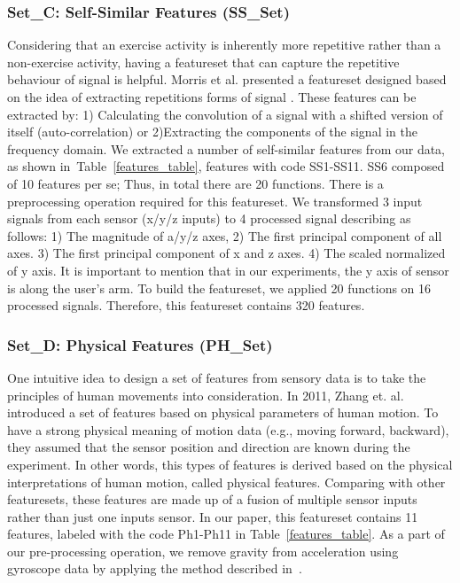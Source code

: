 \documentclass[journal,article,submit,moreauthors,pdftex]{Definitions/mdpi}
\begin{document}
\subsubsection{Set\_C: Self-Similar Features (SS\_Set)}

Considering that an exercise activity is inherently more repetitive rather than a non-exercise activity, having a featureset that can capture the repetitive behaviour of signal is helpful. Morris et al. presented a featureset designed based on the idea of extracting repetitions forms of signal \cite{morris2014recofit}. These features can be extracted by: 1) Calculating the convolution of a signal with a shifted version of itself (auto-correlation) or 2)Extracting the components of the signal in the frequency domain. We extracted a number of self-similar features from our data, as shown in~Table~\ref{features_table}, features with code SS1-SS11. SS6 composed of 10 features per se; Thus, in total there are 20 functions.
There is a preprocessing operation required for this featureset. We transformed 3 input signals from each sensor (x/y/z inputs) to 4 processed signal describing as follows: 1) The magnitude of a/y/z axes, 2) The first principal component of all axes. 3) The first principal component of x and z axes. 4) The scaled normalized of y axis. It is important to mention that in our experiments, the y axis of sensor is along the user's arm. To build the featureset, we applied 20 functions on 16 processed signals. Therefore, this featureset contains 320 features.

\subsubsection{Set\_D: Physical Features (PH\_Set)}
One intuitive idea to design a set of features from sensory data is to take the principles of human movements into consideration. In 2011, Zhang et. al. ~\cite{zhang2011feature} introduced a set of features based on physical parameters of human motion. To have a strong physical meaning of motion data (e.g., moving forward, backward), they assumed that the sensor position and direction are known during the experiment. In other words, this types of features is derived based on the physical interpretations of human motion, called physical features. Comparing with other featuresets, these features are made up of a fusion of multiple sensor inputs rather than just one inputs sensor. In our paper, this featureset contains 11 features, labeled with the code Ph1-Ph11 in Table~\ref{features_table}. As a part of our pre-processing operation, we remove gravity from acceleration using gyroscope data by applying the method described in~\cite{Accelero5:online}.
\end{document}
